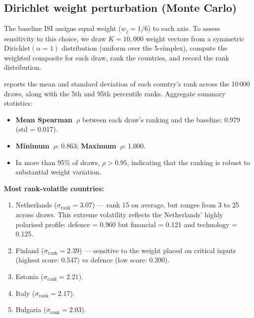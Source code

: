 \subsection{Dirichlet weight perturbation (Monte Carlo)}\label{sec:dirichlet}

The baseline ISI assigns equal weight ($w_j = 1/6$) to each axis.
To assess sensitivity to this choice, we draw $K = 10{,}000$
weight vectors from a symmetric $\text{Dirichlet}(\alpha = 1)$
distribution (uniform over the 5-simplex), compute the weighted
composite for each draw, rank the countries, and record the rank
distribution.



 reports the mean and standard
deviation of each country's rank across the 10\,000 draws, along
with the 5th and 95th percentile ranks.  Aggregate summary
statistics:

\begin{itemize}[leftmargin=2em]
  \item \textbf{Mean Spearman~$\rho$} between each draw's ranking
    and the baseline: \num{0.979} (std = \num{0.017}).
  \item \textbf{Minimum~$\rho$}: \num{0.863};
    \textbf{Maximum~$\rho$}: \num{1.000}.
  \item In more than 95\% of draws, $\rho > 0.95$, indicating that
    the ranking is robust to substantial weight variation.
\end{itemize}

\textbf{Most rank-volatile countries:}
\begin{enumerate}[leftmargin=2em]
  \item Netherlands ($\sigma_{\text{rank}} = 3.07$) --- rank 15 on
    average, but ranges from 3 to 25 across draws.  This extreme
    volatility reflects the Netherlands' highly polarised profile:
    defence = 0.960 but financial = 0.121 and technology = 0.125.
  \item Finland ($\sigma_{\text{rank}} = 2.39$) --- sensitive to
    the weight placed on critical inputs (highest score: 0.547) vs
    defence (low score: 0.390).
  \item Estonia ($\sigma_{\text{rank}} = 2.21$).
  \item Italy ($\sigma_{\text{rank}} = 2.17$).
  \item Bulgaria ($\sigma_{\text{rank}} = 2.03$).
\end{enumerate}

